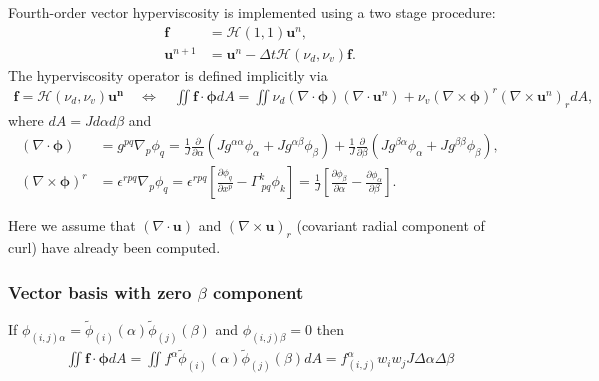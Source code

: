 \documentclass{article}
\newcommand{\vb}{\mathbf}
\newcommand{\vg}{\boldsymbol}
\newcommand{\pdiff}[2]{\frac{\partial #1}{\partial #2}}
\begin{document}
Fourth-order vector hyperviscosity is implemented using a two stage procedure:
\begin{align}
\vb{f} &= \mathcal{H}(1,1) \vb{u}^n, \\
\vb{u}^{n+1} &= \vb{u}^n - \Delta t \mathcal{H}(\nu_d, \nu_v) \vb{f}.
\end{align}  The hyperviscosity operator is defined implicitly via
\begin{align}
\vb{f} = \mathcal{H}(\nu_d, \nu_v) \vb{u^n} \quad \Longleftrightarrow \quad \iint \vb{f} \cdot \vg{\phi} dA = \iint \nu_d (\nabla \cdot \vg{\phi}) (\nabla \cdot \vb{u}^n) + \nu_v (\nabla \times \vg{\phi})^r (\nabla \times \vb{u}^n)_r dA,
\end{align} where $dA = J d\alpha d\beta$ and
\begin{align}
(\nabla \cdot \vg{\phi}) &= g^{p q} \nabla_p \phi_q = \frac{1}{J} \pdiff{}{\alpha} \left( J g^{\alpha \alpha} \phi_\alpha + J g^{\alpha \beta} \phi_\beta \right) + \frac{1}{J} \pdiff{}{\beta} \left( J g^{\beta \alpha} \phi_\alpha + J g^{\beta \beta} \phi_\beta \right), \\
(\nabla \times \vg{\phi})^r &= \epsilon^{r p q} \nabla_p \phi_q = \epsilon^{r p q} \left[ \pdiff{\phi_q}{x^p} - \Gamma^{k}_{\ p q} \phi_k \right] = \frac{1}{J} \left[ \pdiff{\phi_\beta}{\alpha} - \pdiff{\phi_\alpha}{\beta} \right].
\end{align}

Here we assume that $(\nabla \cdot \vb{u})$ and $(\nabla \times \vb{u})_r$ (covariant radial component of curl) have already been computed.

\subsubsection{Vector basis with zero $\beta$ component}

If $\phi_{(i,j) \alpha} = \tilde{\phi}_{(i)}(\alpha) \tilde{\phi}_{(j)}(\beta)$ and $\phi_{(i,j) \beta} = 0$ then
\begin{align} \label{eq:VecHyperviscosityZeroBetaLHS}
\iint \vb{f} \cdot \vb{\phi} dA = \iint f^\alpha \tilde{\phi}_{(i)}(\alpha) \tilde{\phi}_{(j)}(\beta) dA = f^\alpha_{(i,j)} w_i w_j J \Delta \alpha \Delta \beta
\end{align}
\end{document}
